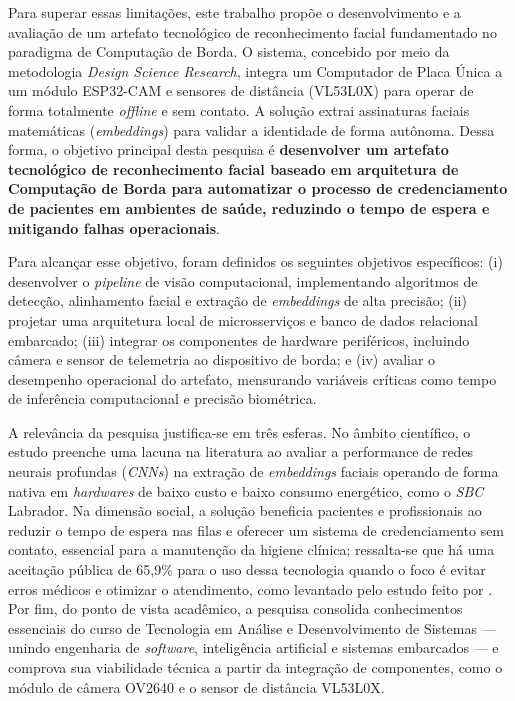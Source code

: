 Para superar essas limitações, este trabalho propõe o desenvolvimento e a avaliação de um artefato tecnológico de reconhecimento facial fundamentado no paradigma de Computação de Borda. O sistema, concebido por meio da metodologia \textit{Design Science Research}, integra um Computador de Placa Única a um módulo ESP32-CAM e sensores de distância (VL53L0X) para operar de forma totalmente \textit{offline} e sem contato. A solução extrai assinaturas faciais matemáticas (\textit{embeddings}) para validar a identidade de forma autônoma. Dessa forma, o objetivo principal desta pesquisa é \textbf{desenvolver um artefato tecnológico de reconhecimento facial baseado em arquitetura de Computação de Borda para automatizar o processo de credenciamento de pacientes em ambientes de saúde, reduzindo o tempo de espera e mitigando falhas operacionais}.

Para alcançar esse objetivo, foram definidos os seguintes objetivos específicos: (i) desenvolver o \textit{pipeline} de visão computacional, implementando algoritmos de detecção, alinhamento facial e extração de \textit{embeddings} de alta precisão; (ii) projetar uma arquitetura local de microsserviços e banco de dados relacional embarcado; (iii) integrar os componentes de hardware periféricos, incluindo câmera e sensor de telemetria ao dispositivo de borda; e (iv) avaliar o desempenho operacional do artefato, mensurando variáveis críticas como tempo de inferência computacional e precisão biométrica.

A relevância da pesquisa justifica-se em três esferas. No âmbito científico, o estudo preenche uma lacuna na literatura ao avaliar a performance de redes neurais profundas (\textit{CNNs}) na extração de \textit{embeddings} faciais operando de forma nativa em \textit{hardwares} de baixo custo e baixo consumo energético, como o \textit{SBC} Labrador. Na dimensão social, a solução beneficia pacientes e profissionais ao reduzir o tempo de espera nas filas e oferecer um sistema de credenciamento sem contato, essencial para a manutenção da higiene clínica; ressalta-se que há uma aceitação pública de 65,9\% para o uso dessa tecnologia quando o foco é evitar erros médicos e otimizar o atendimento, como levantado pelo estudo feito por . Por fim, do ponto de vista acadêmico, a pesquisa consolida conhecimentos essenciais do curso de Tecnologia em Análise e Desenvolvimento de Sistemas — unindo engenharia de \textit{software}, inteligência artificial e sistemas embarcados — e comprova sua viabilidade técnica a partir da integração de componentes, como o módulo de câmera OV2640 e o sensor de distância VL53L0X.

